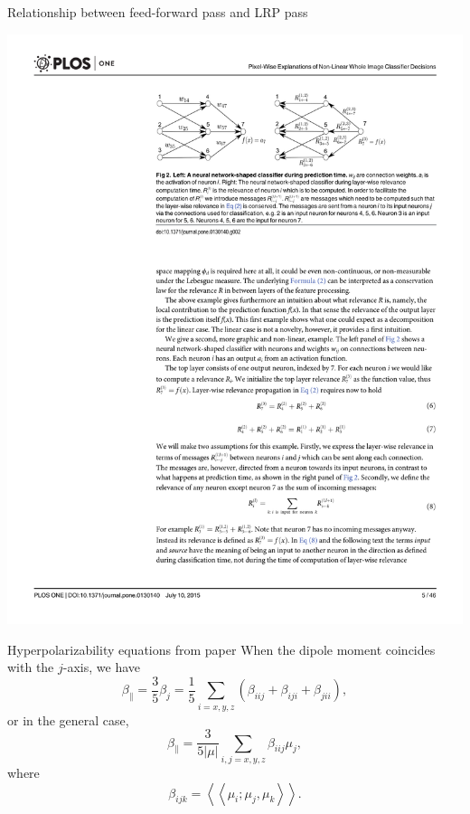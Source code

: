 \documentclass[compress]{beamer}
\begin{document}
\begin{frame}{Relationship between feed-forward pass and LRP pass}
  \begin{center}
    \includegraphics[width=1.05\textwidth]{./figures/fig2_trimmed.pdf}
  \end{center}
\end{frame}

\begin{frame}{Hyperpolarizability equations from paper}
  When the dipole moment coincides with the \(j\)-axis, we have
  \begin{equation*}
    \beta_{\parallel} = \frac{3}{5}\beta_j = \frac{1}{5} \sum_{i=x,y,z} (\beta_{iij} + \beta_{iji} + \beta_{jii}),
  \end{equation*}
  or in the general case,
  \begin{equation*}
    \beta_{\parallel} = \frac{3}{5|\mu|} \sum_{i,j=x,y,z} \beta_{iij} \mu_{j},
  \end{equation*}
  where
  \begin{equation*}
    \beta_{ijk} = \left<\left<\mu_{i};\mu_{j},\mu_{k}\right>\right>.
  \end{equation*}
\end{frame}
\end{document}
